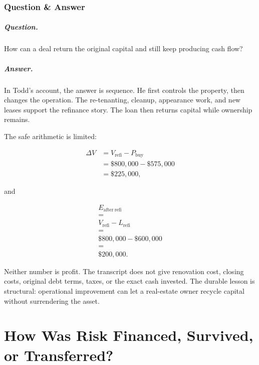 \documentclass[11pt,oneside]{book}
\begin{document}
\subsection{Question \& Answer}

\paragraph{Question.}
How can a deal return the original capital and still keep producing cash flow?

\paragraph{Answer.}
In Todd's account, the answer is sequence. He first controls the property, then changes the operation. The re-tenanting, cleanup, appearance work, and new leases support the refinance story. The loan then returns capital while ownership remains.

The safe arithmetic is limited:

\begin{align}
\Delta V
&=
V_{\mathrm{refi}}-P_{\mathrm{buy}}\\
&=
\$800{,}000-\$575{,}000\\
&=
\$225{,}000,
\end{align}

and

\begin{equation}
\begin{gathered}
E_{\mathrm{after\ refi}}\\
=\\
V_{\mathrm{refi}}-L_{\mathrm{refi}}\\
=\\
\$800{,}000-\$600{,}000\\
=\\
\$200{,}000.
\end{gathered}
\end{equation}

Neither number is profit. The transcript does not give renovation cost, closing costs, original debt terms, taxes, or the exact cash invested. The durable lesson is structural: operational improvement can let a real-estate owner recycle capital without surrendering the asset.

\chapter{How Was Risk Financed, Survived, or Transferred?}
\end{document}
